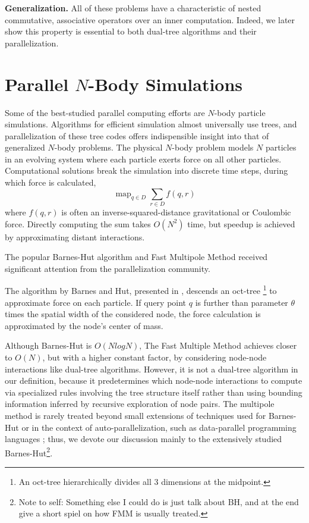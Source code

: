 \documentclass[times, leqno,twocolumn]{article}
\newcommand{\authornote}[1]{\footnote{Note to self: #1}}
\DeclareMathOperator*{\map}{map}
\begin{document}
{\bf Generalization.}
All of these problems have a characteristic of nested commutative, associative operators over an inner computation.
Indeed, we later show this property is essential to both dual-tree algorithms and their parallelization.

\section{Parallel $N$-Body Simulations}

Some of the best-studied parallel computing efforts are $N$-body particle simulations.
Algorithms for efficient simulation almost universally use trees, and parallelization of these tree codes offers indispensible insight into that of generalized $N$-body problems.
The physical $N$-body problem models $N$ particles in an evolving system where each particle exerts force on all other particles.
Computational solutions break the simulation into discrete time steps, during which force is calculated,
\[\map_{q \in D} \sum_{r \in D} f(q,r)\]
\noindent where $f(q,r)$ is often an inverse-squared-distance gravitational or Coulombic force.
Directly computing the sum takes $O(N^2)$ time, but speedup is achieved by approximating distant interactions.

The popular Barnes-Hut algorithm\cite{barnes_hut} and Fast Multipole Method\cite{greengard_fmm} received significant attention from the parallelization community.

The algorithm by Barnes and Hut, presented in \cite{barnes_hut}, descends an oct-tree \footnote{An oct-tree hierarchically divides all 3 dimensions at the midpoint.} to approximate force on each particle.
If query point $q$ is further than parameter $\theta$ times the spatial width of the considered node, the force calculation is approximated by the node's center of mass.

Although Barnes-Hut is $O(N log N)$, The Fast Multiple Method \cite{greengard_fmm} achieves closer to $O(N)$, but with a higher constant factor, by considering node-node interactions like dual-tree algorithms.
However, it is not a dual-tree algorithm in our definition, because it predetermines which node-node interactions to compute via specialized rules involving the tree structure itself rather than using bounding information inferred by recursive exploration of node pairs.
The multipole method is rarely treated beyond small extensions of techniques used for Barnes-Hut \cite{singh95load} or in the context of auto-parallelization, such as data-parallel programming languages \cite{nyland93dataparallel} \cite{washington_nesl}; thus, we devote our discussion mainly to the extensively studied Barnes-Hut\authornote{Something else I could do is just talk about BH, and at the end give a short spiel on how FMM is usually treated.}.
\end{document}

